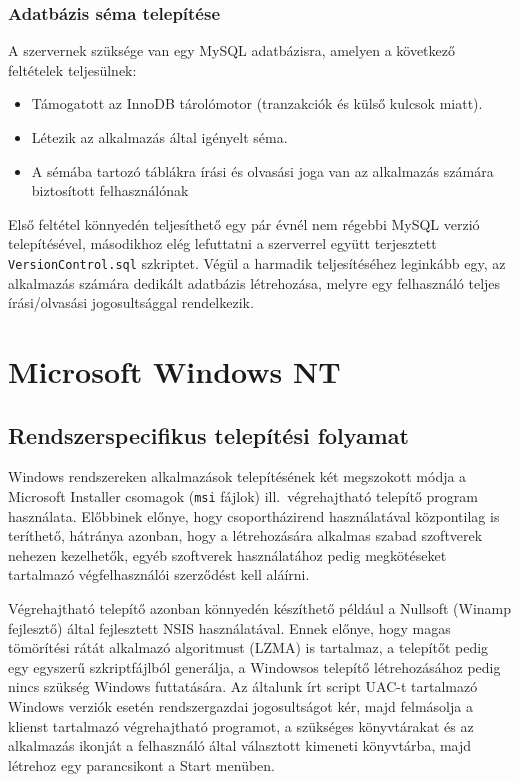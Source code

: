\documentclass[a4paper,12pt]{article}
\begin{document}
\subsubsection{Adatbázis séma telepítése}

A szervernek szüksége van egy MySQL adatbázisra, amelyen a következő feltételek teljesülnek:

\begin{itemize}
\item Támogatott az InnoDB tárolómotor (tranzakciók és külső kulcsok miatt).
\item Létezik az alkalmazás által igényelt séma.
\item A sémába tartozó táblákra írási és olvasási joga van az alkalmazás számára
biztosított felhasználónak
\end{itemize}

Első feltétel könnyedén teljesíthető egy pár évnél nem régebbi MySQL verzió
telepítésével, másodikhoz elég lefuttatni a szerverrel együtt terjesztett
\verb|VersionControl.sql| szkriptet. Végül a harmadik teljesítéséhez
leginkább egy, az alkalmazás számára dedikált adatbázis létrehozása,
melyre egy felhasználó teljes írási/olvasási jogosultsággal rendelkezik.

\clearpage
\section{Microsoft Windows NT}

\subsection{Rendszerspecifikus telepítési folyamat}

Windows rendszereken alkalmazások telepítésének két megszokott módja a Microsoft Installer
csomagok (\verb|msi| fájlok) ill.\ végrehajtható telepítő program használata. Előbbinek
előnye, hogy csoportházirend használatával központilag is teríthető, hátránya azonban,
hogy a létrehozására alkalmas szabad szoftverek nehezen kezelhetők, egyéb szoftverek
használatához pedig megkötéseket tartalmazó végfelhasználói szerződést kell aláírni.

Végrehajtható telepítő azonban könnyedén készíthető például a Nullsoft (Winamp fejlesztő)
által fejlesztett NSIS használatával. Ennek előnye, hogy magas tömörítési rátát alkalmazó
algoritmust (LZMA) is tartalmaz, a telepítőt pedig egy egyszerű szkriptfájlból generálja,
a Windowsos telepítő létrehozásához pedig nincs szükség Windows futtatására. Az általunk
írt script UAC-t tartalmazó Windows verziók esetén rendszergazdai jogosultságot kér, majd
felmásolja a klienst tartalmazó végrehajtható programot, a szükséges könyvtárakat és
az alkalmazás ikonját a felhasználó által választott kimeneti könyvtárba, majd létrehoz
egy parancsikont a Start menüben.
\end{document}
